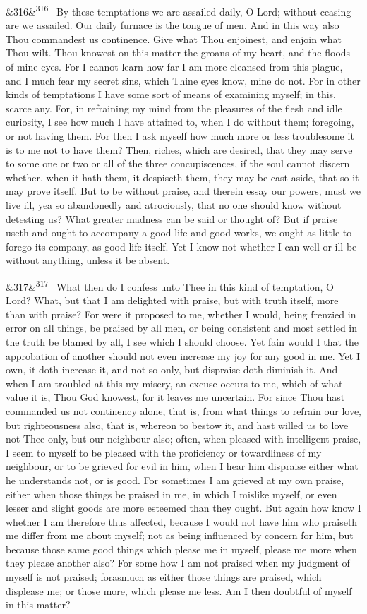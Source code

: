 \documentclass[12pt]{article}
\newcommand{\para}[1][]{\par\noindent\ifx&#1&\else\textsuperscript{\footnotesize #1}~\fi}
\begin{document}
\para[316] By these temptations we are assailed daily, O Lord; without ceasing are we assailed. Our daily furnace is the tongue of men. And in this way also Thou commandest us continence. Give what Thou enjoinest, and enjoin what Thou wilt. Thou knowest on this matter the groans of my heart, and the floods of mine eyes. For I cannot learn how far I am more cleansed from this plague, and I much fear my secret sins, which Thine eyes know, mine do not. For in other kinds of temptations I have some sort of means of examining myself; in this, scarce any. For, in refraining my mind from the pleasures of the flesh and idle curiosity, I see how much I have attained to, when I do without them; foregoing, or not having them. For then I ask myself how much more or less troublesome it is to me not to have them? Then, riches, which are desired, that they may serve to some one or two or all of the three concupiscences, if the soul cannot discern whether, when it hath them, it despiseth them, they may be cast aside, that so it may prove itself. But to be without praise, and therein essay our powers, must we live ill, yea so abandonedly and atrociously, that no one should know without detesting us? What greater madness can be said or thought of? But if praise useth and ought to accompany a good life and good works, we ought as little to forego its company, as good life itself. Yet I know not whether I can well or ill be without anything, unless it be absent.

\para[317] What then do I confess unto Thee in this kind of temptation, O Lord? What, but that I am delighted with praise, but with truth itself, more than with praise? For were it proposed to me, whether I would, being frenzied in error on all things, be praised by all men, or being consistent and most settled in the truth be blamed by all, I see which I should choose. Yet fain would I that the approbation of another should not even increase my joy for any good in me. Yet I own, it doth increase it, and not so only, but dispraise doth diminish it. And when I am troubled at this my misery, an excuse occurs to me, which of what value it is, Thou God knowest, for it leaves me uncertain. For since Thou hast commanded us not continency alone, that is, from what things to refrain our love, but righteousness also, that is, whereon to bestow it, and hast willed us to love not Thee only, but our neighbour also; often, when pleased with intelligent praise, I seem to myself to be pleased with the proficiency or towardliness of my neighbour, or to be grieved for evil in him, when I hear him dispraise either what he understands not, or is good. For sometimes I am grieved at my own praise, either when those things be praised in me, in which I mislike myself, or even lesser and slight goods are more esteemed than they ought. But again how know I whether I am therefore thus affected, because I would not have him who praiseth me differ from me about myself; not as being influenced by concern for him, but because those same good things which please me in myself, please me more when they please another also? For some how I am not praised when my judgment of myself is not praised; forasmuch as either those things are praised, which displease me; or those more, which please me less. Am I then doubtful of myself in this matter?
\end{document}
